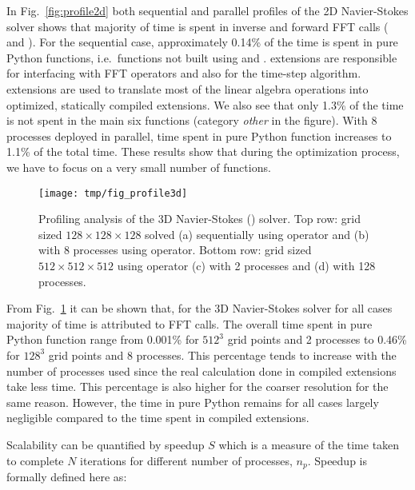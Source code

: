 In Fig.~\ref{fig:profile2d} both sequential and parallel profiles of the 2D
Navier-Stokes solver shows that majority of time is spent in inverse and forward
FFT calls ( and ). For the
sequential case, approximately 0.14\% of the time is spent in pure Python
functions, i.e.\ functions not built using  and .
%
 extensions are responsible for interfacing with FFT operators and
also for the time-step algorithm.   extensions are used to translate
most of the linear algebra operations into optimized, statically compiled
extensions.
%
We also see that only 1.3\% of the time is not spent in the main six functions
(category \emph{other} in the figure).
%
With 8 processes deployed in parallel, time spent in pure Python function
increases to 1.1\% of the total time.
%
These results show that during the optimization process, we have to focus on a
very small number of functions.

\begin{figure}[htp]
\centering
\texttt{[image: tmp/fig\_profile3d]}
\caption{Profiling analysis of the 3D Navier-Stokes
() solver.
%
Top row: grid sized $128\times128\times128$ solved (a) sequentially using
 operator and (b) with 8 processes using
 operator.
%
Bottom row: grid sized $512\times512\times512$ using
 operator (c) with 2 processes and
(d) with 128 processes.}
\label{fig:profile3d}
\end{figure}

From Fig.~\ref{fig:profile3d} it can be shown that, for the 3D Navier-Stokes
solver for all cases majority of time is attributed to FFT calls. The overall time
spent in pure Python function range from 0.001\% for $512^3$ grid points and 2
processes to 0.46\% for $128^3$ grid points and 8 processes.
%
This percentage tends to increase with the number of processes used since the real
calculation done in compiled extensions take less time.
%
This percentage is also higher for the coarser resolution for the same reason.
%
However, the time in pure Python remains for all cases largely negligible compared
to the time spent in compiled extensions.



Scalability can be quantified by speedup $S$ which is a measure of the time taken
to complete $N$ iterations for different number of processes, $n_p$.
Speedup is formally defined here as:

